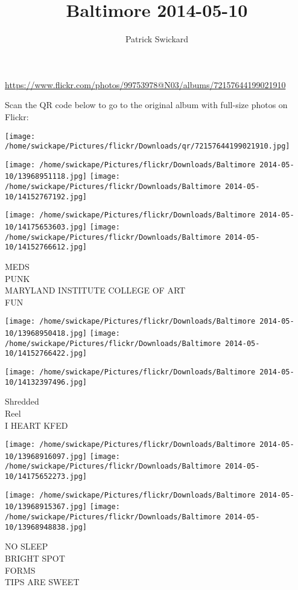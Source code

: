 \documentclass[10pt,letterpaper]{article}
\title{Baltimore 2014-05-10}
\author{Patrick Swickard}
\date{}
\begin{document}
\maketitle

\url{https://www.flickr.com/photos/99753978@N03/albums/72157644199021910}

Scan the QR code below to go to the original album with full-size photos on Flickr:

\texttt{[image: /home/swickape/Pictures/flickr/Downloads/qr/72157644199021910.jpg]}
\pagebreak

\texttt{[image: /home/swickape/Pictures/flickr/Downloads/Baltimore 2014-05-10/13968951118.jpg]}
\texttt{[image: /home/swickape/Pictures/flickr/Downloads/Baltimore 2014-05-10/14152767192.jpg]}

\texttt{[image: /home/swickape/Pictures/flickr/Downloads/Baltimore 2014-05-10/14175653603.jpg]}
\texttt{[image: /home/swickape/Pictures/flickr/Downloads/Baltimore 2014-05-10/14152766612.jpg]}

MEDS\\
PUNK\\
MARYLAND INSTITUTE COLLEGE OF ART\\
FUN
\pagebreak

\texttt{[image: /home/swickape/Pictures/flickr/Downloads/Baltimore 2014-05-10/13968950418.jpg]}
\texttt{[image: /home/swickape/Pictures/flickr/Downloads/Baltimore 2014-05-10/14152766422.jpg]}

\vspace{0.25in}
\texttt{[image: /home/swickape/Pictures/flickr/Downloads/Baltimore 2014-05-10/14132397496.jpg]}

Shredded\\
Reel\\
I HEART KFED
\pagebreak

\texttt{[image: /home/swickape/Pictures/flickr/Downloads/Baltimore 2014-05-10/13968916097.jpg]}
\texttt{[image: /home/swickape/Pictures/flickr/Downloads/Baltimore 2014-05-10/14175652273.jpg]}

\texttt{[image: /home/swickape/Pictures/flickr/Downloads/Baltimore 2014-05-10/13968915367.jpg]}
\texttt{[image: /home/swickape/Pictures/flickr/Downloads/Baltimore 2014-05-10/13968948838.jpg]}

NO SLEEP\\
BRIGHT SPOT\\
FORMS\\
TIPS ARE SWEET
\pagebreak
\end{document}
